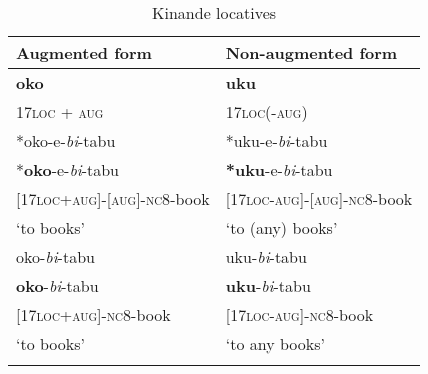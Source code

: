 \documentclass[output=paper]{langscibook}
\begin{document}
\begin{table}
\caption{Kinande locatives}
\label{tab:schneider:Kindandelocatives}
 \begin{tabular}{ll}
  \lsptoprule
           Augmented form &  Non-augmented form \\
  \midrule
  \textbf{oko}  &  \textbf{uku}  \\
  \textsc{17loc + aug} & \textsc{17loc(-aug)} \\\tablevspace
  *oko-e-\textit{bi}-tabu & *uku-e-\textit{bi}-tabu\\
  *\textbf{oko}-e-\textit{bi}-tabu & \textbf{*uku}-e-\textit{bi}-tabu\\
  \textsc{[17loc+aug]-[aug]-nc8}-book  & \textsc{[17loc-aug]-[aug]-nc8}-book\\
  `to books' & `to (any) books'\\\tablevspace
  oko-\textit{bi}-tabu & uku-\textit{bi}-tabu \\
  \textbf{oko}-\textit{bi}-tabu & \textbf{uku}-\textit{bi}-tabu \\
  \textsc{[17loc+aug]-nc8}-book & \textsc{[17loc-aug]-nc8}-book\\
  `to books' & `to any books'\\
  \lspbottomrule
 \end{tabular}
\end{table}
\end{document}
